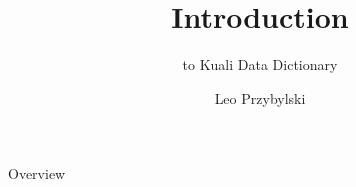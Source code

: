 \documentclass[xcolor=dvipsnames,14pt]{beamer}
\begin{document}
\title{Introduction}
\subtitle{to Kuali Data Dictionary}
\author[Leo]{Leo Przybylski}

\begin{frame}[plain]
  \titlepage
\end{frame}

\begin{frame}{Overview}
\end{frame}
\end{document}
